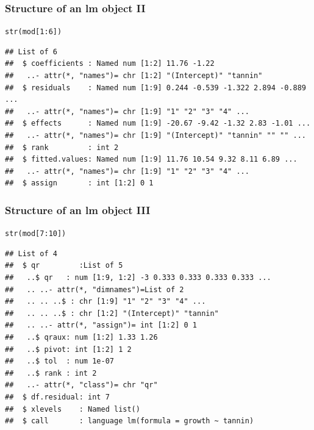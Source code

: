 \documentclass[xcolor=table, xcolor=dvipsnames]{beamer}\usepackage[]{graphicx}\usepackage[]{color}
\makeatletter
\newcommand{\hlnum}[1]{\textcolor[rgb]{0,0,0}{#1}}
\newcommand{\hlopt}[1]{\textcolor[rgb]{0,0,0}{#1}}
\newcommand{\hlstd}[1]{\textcolor[rgb]{0,0,0}{#1}}
\newcommand{\hlkwd}[1]{\textcolor[rgb]{0,0,1}{#1}}
\newenvironment{kframe}{%
 \def\at@end@of@kframe{}%
 \ifinner\ifhmode%
  \def\at@end@of@kframe{\end{minipage}}%
  \begin{minipage}{\columnwidth}%
 \fi\fi%
 \def\FrameCommand##1{\hskip\@totalleftmargin \hskip-\fboxsep
 \colorbox{shadecolor}{##1}\hskip-\fboxsep
     \hskip-\linewidth \hskip-\@totalleftmargin \hskip\columnwidth}%
 \MakeFramed {\advance\hsize-\width
   \@totalleftmargin\z@ \linewidth\hsize
   \@setminipage}}%
 {\par\unskip\endMakeFramed%
 \at@end@of@kframe}
\newenvironment{knitrout}{}{} %
\makeatother
\begin{document}

\begin{frame}[fragile]\frametitle{Structure of an lm object II}
\begin{knitrout}\scriptsize
{}\color{fgcolor}\begin{kframe}
\begin{alltt}
\hlkwd{str}\hlstd{(mod[}\hlnum{1}\hlopt{:}\hlnum{6}\hlstd{])}
\end{alltt}
\begin{verbatim}
## List of 6
##  $ coefficients : Named num [1:2] 11.76 -1.22
##   ..- attr(*, "names")= chr [1:2] "(Intercept)" "tannin"
##  $ residuals    : Named num [1:9] 0.244 -0.539 -1.322 2.894 -0.889 ...
##   ..- attr(*, "names")= chr [1:9] "1" "2" "3" "4" ...
##  $ effects      : Named num [1:9] -20.67 -9.42 -1.32 2.83 -1.01 ...
##   ..- attr(*, "names")= chr [1:9] "(Intercept)" "tannin" "" "" ...
##  $ rank         : int 2
##  $ fitted.values: Named num [1:9] 11.76 10.54 9.32 8.11 6.89 ...
##   ..- attr(*, "names")= chr [1:9] "1" "2" "3" "4" ...
##  $ assign       : int [1:2] 0 1
\end{verbatim}
\end{kframe}
\end{knitrout}
\end{frame}


\begin{frame}[fragile]\frametitle{Structure of an lm object III}
\begin{knitrout}\footnotesize
{}\color{fgcolor}\begin{kframe}
\begin{alltt}
\hlkwd{str}\hlstd{(mod[}\hlnum{7}\hlopt{:}\hlnum{10}\hlstd{])}
\end{alltt}
\begin{verbatim}
## List of 4
##  $ qr         :List of 5
##   ..$ qr   : num [1:9, 1:2] -3 0.333 0.333 0.333 0.333 ...
##   .. ..- attr(*, "dimnames")=List of 2
##   .. .. ..$ : chr [1:9] "1" "2" "3" "4" ...
##   .. .. ..$ : chr [1:2] "(Intercept)" "tannin"
##   .. ..- attr(*, "assign")= int [1:2] 0 1
##   ..$ qraux: num [1:2] 1.33 1.26
##   ..$ pivot: int [1:2] 1 2
##   ..$ tol  : num 1e-07
##   ..$ rank : int 2
##   ..- attr(*, "class")= chr "qr"
##  $ df.residual: int 7
##  $ xlevels    : Named list()
##  $ call       : language lm(formula = growth ~ tannin)
\end{verbatim}
\end{kframe}
\end{knitrout}
\end{frame}
\end{document}
